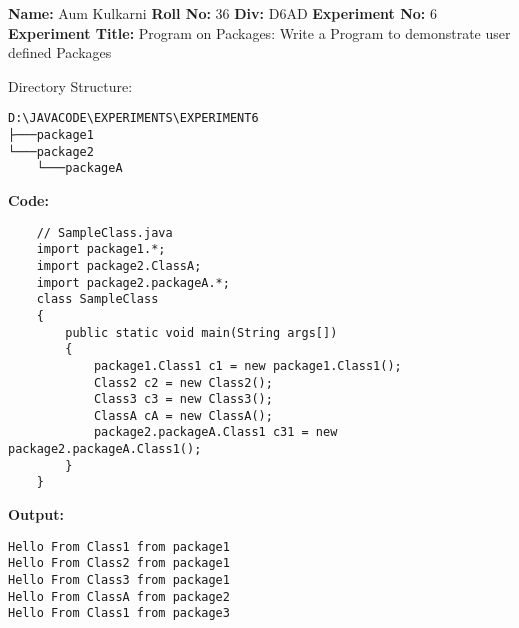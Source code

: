 \documentclass{article}
\begin{document}
\hfill \break
{\huge\textbf{Name:}} {\huge Aum Kulkarni}\newline
\hfill \break
{\huge\textbf{Roll No:} 36}\newline
\hfill \break
{\huge\textbf{Div:} D6AD}\newline
\hfill \break
{\huge\textbf{Experiment No:} 6}\newline
\hfill \break
{\huge\textbf{Experiment Title:} Program on Packages:\newline
Write a Program to demonstrate user defined Packages}

\newpage
Directory Structure:
\begin{verbatim}
D:\JAVACODE\EXPERIMENTS\EXPERIMENT6
├───package1
└───package2
    └───packageA
\end{verbatim}
\textbf{Code:}
\hfill \break
{}\hfill \break
{}\hfill \break
{}\hfill \break
{}\hfill \break
{}
\begin{verbatim}
    // SampleClass.java
    import package1.*;
    import package2.ClassA;
    import package2.packageA.*;
    class SampleClass
    {
        public static void main(String args[])
        {
            package1.Class1 c1 = new package1.Class1();
            Class2 c2 = new Class2();
            Class3 c3 = new Class3();
            ClassA cA = new ClassA();
            package2.packageA.Class1 c31 = new package2.packageA.Class1();
        }
    }
\end{verbatim}

\textbf{Output:}
\begin{verbatim}
Hello From Class1 from package1
Hello From Class2 from package1
Hello From Class3 from package1
Hello From ClassA from package2
Hello From Class1 from package3
\end{verbatim}
\end{document}
